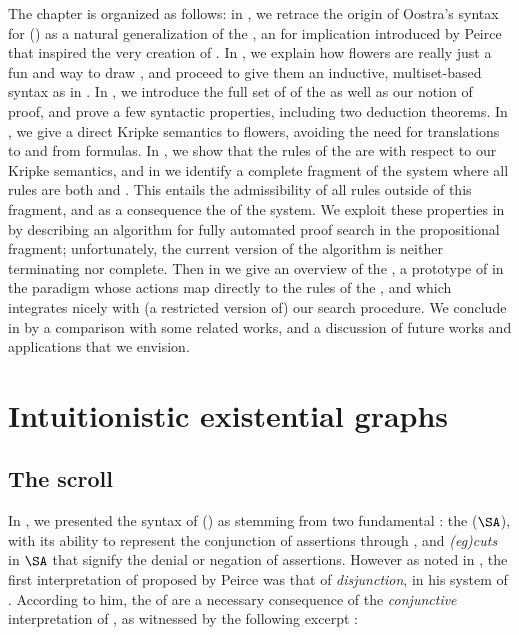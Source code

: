 \begin{scope}
\AP
The chapter is organized as follows: in , we retrace the origin of
Oostra's syntax for  ()
as a natural generalization of the \emph{}, an  for
implication introduced by Peirce that inspired the very creation of . In
, we explain how flowers are really just a fun and
 way to draw , and proceed to give them an inductive,
multiset-based syntax as in . In , we
introduce the full set of  of the  as
well as our notion of proof, and prove a few syntactic properties, including two
deduction theorems. In , we give a direct Kripke semantics to
flowers, avoiding the need for translations to and from formulas. In
, we show that the rules of the  are 
with respect to our Kripke semantics, and in  we identify a
complete fragment of the system where all rules are both \emph{}
and \emph{}. This entails the admissibility of all rules outside
of this fragment, and as a consequence the  of the system. We
exploit these properties in  by describing an algorithm
for fully automated proof search in the propositional fragment; unfortunately,
the current version of the algorithm is neither terminating nor complete. Then
in  we give an overview of the , a
prototype of  in the  paradigm whose actions map
directly to the rules of the , and which integrates nicely
with (a restricted version of) our search procedure. We conclude in
 by a comparison with some related works, and a discussion of
future works and applications that we envision.


\section{Intuitionistic existential graphs}

\subsection{The scroll}

In , we presented the syntax of  () as
stemming from two fundamental : the  ($\SA$),
with its ability to represent the conjunction of assertions through
\emph{}, and \emph{\kl(eg){cuts}} in $\SA$ that signify the denial or
negation of assertions. However as noted in , the first
interpretation of  proposed by Peirce was that of
\emph{disjunction}, in his system of . According to him,
the  of  are a necessary consequence of the
\emph{conjunctive} interpretation of , as witnessed by the
following excerpt :


\end{scope}
